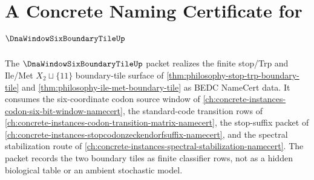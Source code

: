 \chapter{A Concrete Naming Certificate for $\DnaWindowSixBoundaryTileUp$}
\label{ch:concrete-instances-dna-window-six-boundary-tile-namecert}

The $\DnaWindowSixBoundaryTileUp$ packet realizes the finite stop/Trp and Ile/Met $X_2\sqcup\{11\}$ boundary-tile surface of \autoref{thm:philosophy-stop-trp-boundary-tile} and \autoref{thm:philosophy-ile-met-boundary-tile} as BEDC NameCert data. It consumes the six-coordinate codon source window of \autoref{ch:concrete-instances-codon-six-bit-window-namecert}, the standard-code transition rows of \autoref{ch:concrete-instances-codon-transition-matrix-namecert}, the stop-suffix packet of \autoref{ch:concrete-instances-stopcodonzeckendorfsuffix-namecert}, and the spectral stabilization route of \autoref{ch:concrete-instances-spectral-stabilization-namecert}. The packet records the two boundary tiles as finite classifier rows, not as a hidden biological table or an ambient stochastic model.

